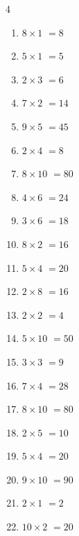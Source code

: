 \begin{multicols}{4}
\begin{enumerate}
  \item $8\times 1$
        $=8$

  \item $5\times 1$
        $=5$

  \item $2\times 3$
        $=6$

  \item $7\times 2$
        $=14$

  \item $9\times 5$
        $=45$

  \item $2\times 4$
        $=8$

  \item $8\times 10$
        $=80$

  \item $4\times 6$
        $=24$

  \item $3\times 6$
        $=18$

\columnbreak %

\resetques

  \item $8\times 2$
        $=16$

  \item $5\times 4$
        $=20$

  \item $2\times 8$
        $=16$

  \item $2\times 2$
        $=4$

  \item $5\times 10$
        $=50$

  \item $3\times 3$
        $=9$

  \item $7\times 4$
        $=28$

  \item $8\times 10$
        $=80$

  \item $2\times 5$
        $=10$

  \item $5\times 4$
        $=20$

  \item $9\times 10$
        $=90$

  \item $2\times 1$
        $=2$

  \item $10\times 2$
        $=20$


\end{enumerate}
\end{multicols}
